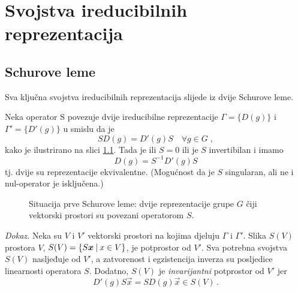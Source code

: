 

\chapter{Svojstva ireducibilnih reprezentacija}

\section{Schurove leme}

Sva ključna svojstva ireducibilnih reprezentacija slijede iz 
dvije Schurove leme.
 

\begin{teorem}
Neka operator S povezuje dvije  ireducibilne
reprezentacije $\Gamma=\{D(g)\}$ i $\Gamma'=\{D'(g)\}$ u smislu da je
\begin{displaymath}
  SD(g)=D'(g)S  \quad \forall g\in G  \;,
\end{displaymath}
kako je ilustrirano na slici \ref{fig:schur}.
Tada je ili $S=0$ ili je $S$ invertibilan i imamo
\begin{displaymath}
D(g)=S^{-1}D'(g)S
\end{displaymath}
tj. dvije su reprezentacije ekvivalentne. (Mogućnost
da je $S$ singularan, ali ne i nul-operator je isključena.)
\end{teorem}

\begin{figure}[htpb]
    \centering
    \centerline{}
    \caption{Situacija prve Schurove leme: 
        dvije reprezentacije grupe $G$ čiji vektorski prostori su
    povezani operatorom $S$.}
    \label{fig:schur}
\end{figure}

\emph{Dokaz.}
Neka su $V$ i $V'$ vektorski prostori na kojima djeluju $\Gamma$ i $\Gamma'$.
Slika $S(V)$ prostora $V$, $S(V)=\{S\vec{x} \td x \in V \}$, je potprostor od $V'$. 
Sva potrebna svojstva
$S(V)$ nasljeđuje od $V'$, a zatvorenost i egzistencija inverza su 
posljedice linearnosti operatora $S$.
Dodatno, $S(V)$ je \emph{invarijantni} potprostor od $V'$ jer
$$D'(g)S\vec{x}=SD(g)\vec{x} \in S(V)\,.$$

